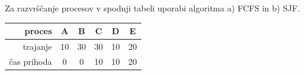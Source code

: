 \begin{Exercise}
Za razvrščanje procesov v spodnji tabeli uporabi algoritma a) FCFS in b) SJF.
\par\vspace{5pt}
{\centering
\begin{tabular}{r|ccccc}
	proces & A & B & C & D & E \\
	\hline
	trajanje & 10 & 30 & 30 & 10 & 20 \\
	čas prihoda & 0 & 0 & 10 & 10 & 20 \\
\end{tabular}\\}
\end{Exercise}
